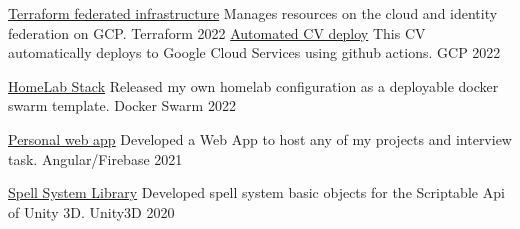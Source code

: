 

\begin{cvhonors}

  \cvhonor
    {\href{https://github.com/FarDust/terraform-infrastructure}{Terraform federated infrastructure}} %
    {Manages resources on the cloud and identity federation on GCP.} 
    {Terraform} %
    {2022} %
  \cvhonor
    {\href{https://github.com/FarDust/homelab-stack}{Automated CV deploy}} 
    {This CV automatically deploys to Google Cloud Services using github actions.} 
    {GCP} %
    {2022} %

  \cvhonor
    {\href{https://github.com/FarDust/homelab-stack}{HomeLab Stack}} 
    {Released my own homelab configuration as a deployable docker swarm template.} 
    {Docker Swarm} %
    {2022} %

  \cvhonor
    {\href{https://github.com/FarDust/fardust-web}{Personal web app}} 
    {Developed a Web App to host any of my projects and interview task.} 
    {Angular/Firebase} %
    {2021} %

  \cvhonor
    {\href{https://github.com/FarDust/SpellSystem}{Spell System Library}} 
    {Developed spell system basic objects for the Scriptable Api of Unity 3D.} 
    {Unity3D} %
    {2020} %

\end{cvhonors}